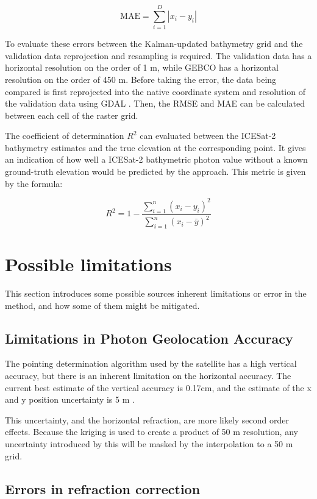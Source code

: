 $$ \text{MAE} = \sum_{i=1}^{D}|x_i-y_i| $$

To evaluate these errors between the Kalman-updated bathymetry grid and the validation data reprojection and resampling is required. The validation data has a horizontal resolution on the order of 1 m, while GEBCO has a horizontal resolution on the order of 450 m. Before taking the error, the data being compared is first reprojected into the native coordinate system and resolution of the validation data using GDAL \parencite{rouault_even_2022_6352176}. Then, the RMSE and MAE can be calculated between each cell of the raster grid.

The coefficient of determination $R^2$ can evaluated between the ICESat-2 bathymetry estimates and the true elevation at the corresponding point. It gives an indication of how well a ICESat-2 bathymetric photon value without a known ground-truth elevation would be predicted by the approach. This metric is given by the formula:

\begin{equation}
    R^2 = 1 - \frac{\sum_{i=1}^{n} (x_i - y_i)^2}{\sum_{i=1}^{n} (x_i - \bar{y})^2}
\end{equation}


\section{Possible limitations}

This section introduces some possible sources inherent limitations or error in the method, and how some of them might be mitigated.

\subsection{Limitations in Photon Geolocation Accuracy}

The pointing determination algorithm used by the satellite has a high vertical accuracy, but there is an inherent limitation on the horizontal accuracy. The current best estimate of the vertical accuracy is 0.17cm, and the estimate of the x and y position uncertainty is 5 m \parencite{Neumann2019c}.

This uncertainty, and the horizontal refraction, are more likely second order effects. Because the kriging is used to create a product of 50 m resolution, any uncertainty introduced by this will be masked by the interpolation to a 50 m grid.

\subsection{Errors in refraction correction}


